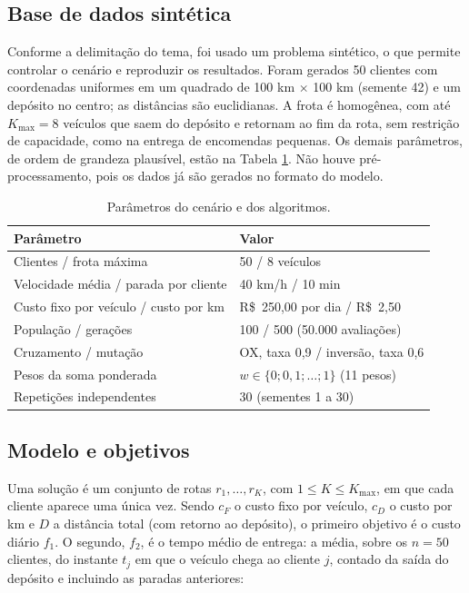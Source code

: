 \documentclass[a4paper,12pt]{article}
\begin{document}
\subsection{Base de dados sintética}\label{sec:base}
\noindent Conforme a delimitação do tema, foi usado um problema sintético, o que permite controlar o cenário e reproduzir os resultados. Foram gerados 50 clientes com coordenadas uniformes em um quadrado de 100 km $\times$ 100 km (semente 42) e um depósito no centro; as distâncias são euclidianas. A frota é homogênea, com até $K_{\max} = 8$ veículos que saem do depósito e retornam ao fim da rota, sem restrição de capacidade, como na entrega de encomendas pequenas. Os demais parâmetros, de ordem de grandeza plausível, estão na Tabela \ref{tab:param}. Não houve pré-processamento, pois os dados já são gerados no formato do modelo.

\begin{table}[!htb]
  \centering
  \caption{Parâmetros do cenário e dos algoritmos.}
  \label{tab:param}
  \small
  \begin{tabular}{ll}
    \toprule
    Parâmetro & Valor \\
    \midrule
    Clientes / frota máxima & 50 / 8 veículos \\
    Velocidade média / parada por cliente & 40 km/h / 10 min \\
    Custo fixo por veículo / custo por km & R\$~250,00 por dia / R\$~2,50 \\
    População / gerações & 100 / 500 (50.000 avaliações) \\
    Cruzamento / mutação & OX, taxa 0,9 / inversão, taxa 0,6 \\
    Pesos da soma ponderada & $w \in \{0; 0{,}1; \ldots; 1\}$ (11 pesos) \\
    Repetições independentes & 30 (sementes 1 a 30) \\
    \bottomrule
  \end{tabular}
\end{table}

\subsection{Modelo e objetivos}\label{sec:modelo}
\noindent Uma solução é um conjunto de rotas $r_1, \ldots, r_K$, com $1 \le K \le K_{\max}$, em que cada cliente aparece uma única vez. Sendo $c_F$ o custo fixo por veículo, $c_D$ o custo por km e $D$ a distância total (com retorno ao depósito), o primeiro objetivo é o custo diário $f_1$. O segundo, $f_2$, é o tempo médio de entrega: a média, sobre os $n = 50$ clientes, do instante $t_j$ em que o veículo chega ao cliente $j$, contado da saída do depósito e incluindo as paradas anteriores:
\end{document}
